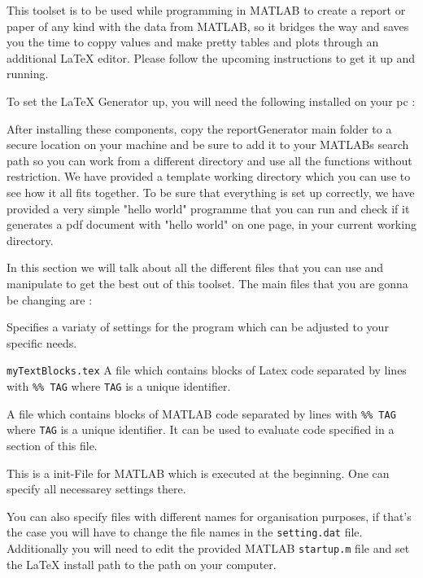 
This toolset is to be used while programming in MATLAB to create a report or paper of any
kind with the data from MATLAB, so it bridges the way and saves you the time to coppy
values and make pretty tables and plots through an additional LaTeX editor. Please follow the
upcoming instructions to get it up and running.



To set the LaTeX Generator up, you will need the following installed on your pc :


After installing these components, copy the reportGenerator main folder to a secure location
on your machine and be sure to add it to your MATLABs search path so you can work from
a different directory and use all the functions without restriction. We have provided a template
working directory which you can use to see how it all fits together. To be sure that everything
is set up correctly, we have provided a very simple "hello world" programme that you can run
and check if it generates a pdf document with "hello world" on one page, in your current working
directory.


In this section we will talk about all the different files that you can use and manipulate to 
get the best out of this toolset. The main files that you are gonna be changing are :

\begin{description}
\item[{\tt setting.dat}] Specifies a variaty of settings for the program which can be adjusted 
to your specific needs.
\item{{\tt myTextBlocks.tex}} A file which contains blocks of Latex code 
separated by lines with {\tt \%\% TAG} where {\tt TAG} is a unique identifier.
\item[{\tt myCodeBlocks.m}] A file which contains blocks of MATLAB code 
separated by lines with {\tt \%\% TAG} where {\tt TAG} is a unique identifier.
It can be used to evaluate code specified in a section of this file.
\item[{\tt myMatlabInit.m}] This is a init-File for MATLAB which is executed 
at the beginning. One can specify all necessarey settings there.
\end{description}

You can also specify files with different names for organisation purposes, if that's the case
you will have to change the file names in the {\tt setting.dat} file.
Additionally you will need to edit the provided MATLAB {\tt startup.m} file and set the \LaTeX{} 
install path to the path on your computer.




